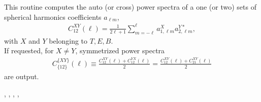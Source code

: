 
\sloppy


\section[alm2cl*]{ }
\label{sub:alm2cl}
\author{Eric Hivon}

\begin{facility}
{This routine computes the auto (or cross) power spectra of a one (or two) sets of spherical harmonics
  coefficients $a_{\ell m}$,
\begin{eqnarray}
C_{12}^{XY}(\ell) = \frac{1}{2 \ell +1}
\sum_{m=-\ell}^{\ell} a_{1,\ell m}^X
  a_{2,\ell m}^{Y*},
\end{eqnarray}
with $X$ and $Y$ belonging to $T,E,B$. \\
If requested, for $X \ne Y$, symmetrized power spectra
\begin{eqnarray}
  C_{\{12\}}^{\{XY\}}(\ell) \equiv \frac{C_{12}^{XY}(\ell)+C_{12}^{YX}(\ell)}{2} = \frac{C_{12}^{XY}(\ell)+C_{21}^{XY}(\ell)}{2}
\end{eqnarray}
are output.


}
{\modAlmTools}
\end{facility}

\begin{f90format}
{%
, %
, %
,  %
, %
}
\end{f90format}
\aboutoptional


